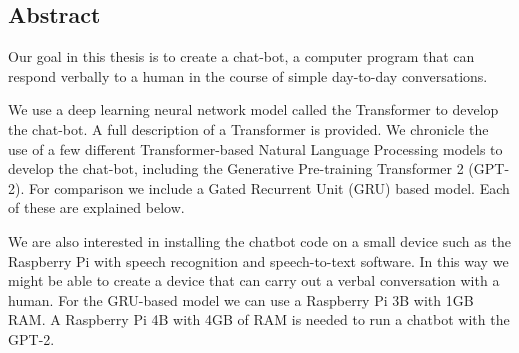 
\begin{center}
	
\section*{Abstract}
\end{center}



Our goal in this thesis is to create a chat-bot, a computer program that can respond verbally to a human in the course of simple day-to-day conversations.

We use a deep learning neural network model called the Transformer to develop the chat-bot. A full description of a Transformer is provided. We chronicle  the use of a few different Transformer-based Natural Language Processing models to develop the chat-bot, including the Generative Pre-training Transformer 2 (GPT-2). For comparison we include a Gated Recurrent Unit (GRU) based model. Each of these are explained below.

We are also interested in installing the chatbot code on a small device  such as the Raspberry Pi with speech recognition and speech-to-text software. In this way we might be able to create a device that can carry out a verbal conversation with a human. For the GRU-based model we can use a Raspberry Pi 3B with 1GB RAM. A Raspberry Pi 4B with 4GB of RAM is needed to run a chatbot with the GPT-2. 


